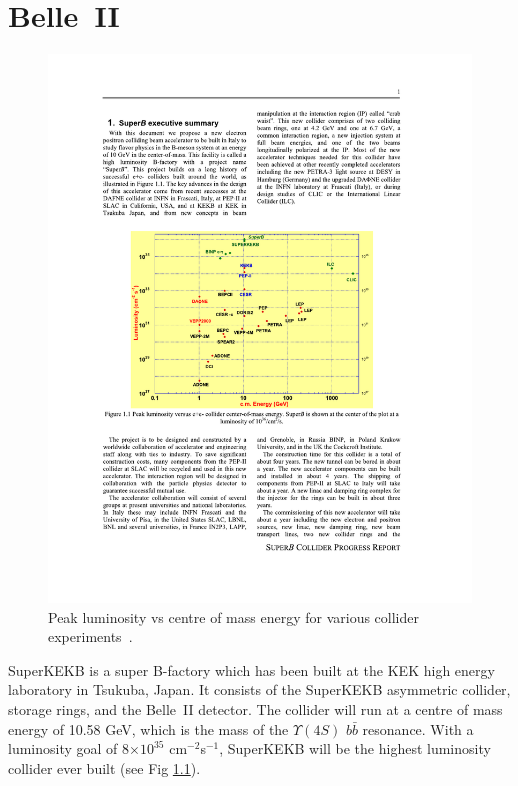 
\chapter{Belle~II}
\label{chap:belleIIDet}

\begin{figure}[htb]
	\centering
		\includegraphics[trim=100 280 150 250,clip=true, scale=0.9]{images/CMvsLum.pdf}
	\caption[Peak luminosity vs centre of mass energy for various collider experiments]{Peak luminosity vs centre of mass energy for various collider experiments~\cite{superbaccelerator}.}	
	\label{fig:CMvsLUM}
\end{figure}

SuperKEKB is a super B-factory which has been built at the KEK high energy laboratory in Tsukuba, Japan. It consists of the SuperKEKB asymmetric \epem collider, storage rings, and the Belle~II detector. The collider will run at a centre of mass energy of 10.58 GeV, which is the mass of the $\Upsilon(4S)$  $b\bar{b}$ resonance. With a luminosity goal of  8$\times10^{35}$ cm$^{-2}$s$^{-1}$, SuperKEKB will be the highest luminosity \epem collider ever built (see Fig \ref{fig:CMvsLUM}).

